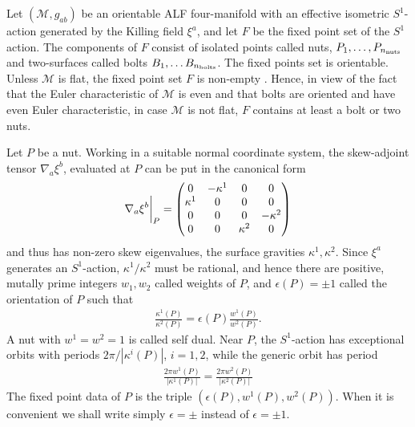 \documentclass[a4paper,10pt,reqno]{amsart}
\newcommand{\nut}{P}
\newcommand{\bolt}{B}
\newcommand{\cM}{\mathcal{M}}
\theoremstyle{plain}
\newcommand{\nnuts}{n_{\text{\rm nuts}}}
\newcommand{\nbolts}{n_{\text{\rm bolts}}}
\newcommand{\eps}{\epsilon}
\newcommand{\Fixed}{F}
\numberwithin{equation}{section}
\begin{document}
Let $(\cM, g_{ab})$ be an orientable ALF  four-manifold with an effective isometric $S^1$-action generated by the Killing field $\xi^a$, and let $\Fixed$ be the fixed point set of the $S^1$ action.  The components of $\Fixed$ consist of isolated points called nuts, $\nut_1, \dots, \nut_{\nnuts}$ and two-surfaces called  bolts $\bolt_1, \dots \bolt_{\nbolts}$.  The fixed points set is orientable. Unless $\cM$  is flat, the fixed point set $\Fixed$ is non-empty \cite{MR3973911}. Hence, in view of the fact that the Euler characteristic of $\cM$ is even and that bolts are oriented and have even Euler characteristic,  in case $\cM$ is not flat, $\Fixed$ contains at least a bolt or two nuts. 

Let $\nut$ be a nut. Working in a suitable normal coordinate system, the skew-adjoint tensor $\nabla_a \xi^b$, 
evaluated at $\nut$ can be put in the canonical form  
\begin{align} \label{eq:nablaxi(nut)}
\nabla_a \xi^b \bigg{|}_{\nut} 
= 
\begin{pmatrix}
0&-\kappa^1&0&0 \\
\kappa^1&0&0&0 \\
0&0&0&-\kappa^2
\\0&0&\kappa^2&0
\end{pmatrix}
\end{align} 
and thus has non-zero skew eigenvalues, the surface gravities $\kappa^1, \kappa^2$. Since $\xi^a$ generates an $S^1$-action, $\kappa^1/\kappa^2$ must be rational, and hence there are positive, mutally prime integers $w_1, w_2$ called weights of $\nut$, and $\eps(\nut) = \pm 1$ called the orientation of $\nut$ such that    
\begin{align} 
\frac{\kappa^1(\nut)}{\kappa^2(\nut)} = \eps(\nut) \frac{w^1(\nut)}{w^2(\nut)} .
\end{align} 
A nut with $w^1=w^2=1$ is called self dual. Near $\nut$, the $S^1$-action has exceptional orbits with periods $2\pi/|\kappa^i(\nut)|$, $i=1,2$, while the generic orbit has period 
\begin{align} 
\frac{2\pi w^1(\nut)}{|\kappa^1(\nut)|} = \frac{2 \pi w^2(\nut)}{|\kappa^2(\nut)|}
\end{align}  
The fixed point data of $\nut$ is the triple $(\eps(\nut), w^1(\nut), w^2(\nut))$. When it is convenient we shall write simply $\eps=\pm$ instead of $\eps=\pm 1$. 
\end{document}
